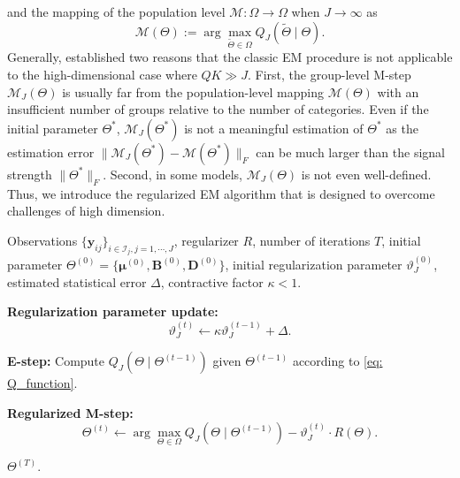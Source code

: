 \documentclass[]{report}
\theoremstyle{definition}
\begin{document}
and the mapping of the population level $\mathcal{M}:\Omega \to \Omega$ when $J\to \infty$ as
\begin{equation}
    \mathcal{M}(\Theta):=\arg\max\limits_{\tilde{\Theta} \in \Omega}Q_{J}(\tilde{\Theta}\mid \Theta).
\end{equation}
Generally, \cite{yi2015regularizedemalgorithmsunified} established two reasons that the classic EM procedure is not applicable to the high-dimensional case where $QK\gg J$. First, the group-level M-step $\mathcal{M}_{J}(\Theta)$ is usually far from the population-level mapping $\mathcal{M}(\Theta)$ with an insufficient number of groups relative to the number of categories. Even if the initial parameter $\Theta^{*}$, $\mathcal{M}_{J}(\Theta^{*})$ is not a meaningful estimation of $\Theta^{*}$ as the estimation error $\lVert \mathcal{M}_{J}(\Theta^{*})-\mathcal{M}(\Theta^{*}) \rVert_F$ can be much larger than the signal strength $\lVert \Theta^{*} \rVert_F$.  Second, in some models, $\mathcal{M}_{J}(\Theta)$ is not even well-defined.
Thus, we introduce the regularized EM algorithm that is designed to overcome challenges of high dimension.
\begin{algorithm}[H]
\caption{High Dimensional Regularized EM Algorithm \cite{yi2015regularizedemalgorithmsunified}} 
\begin{algorithmic}[1]
 
\Require Observations $\{\bm{y}_{ij}\}_{i\in \mathcal{I}_{j},j=1,\cdots,J}$, regularizer $R$, number of iterations $T$, 
initial parameter $\Theta^{(0)}=\{\bm{\mu}^{(0)},\mathbf{B}^{(0)},\mathbf{D}^{(0)}\}$, initial regularization parameter $\vartheta_{J}^{(0)}$, 
estimated statistical error $\Delta$, contractive factor $\kappa < 1$.


\State \textbf{Regularization parameter update:}
\[
\vartheta_{J}^{(t)} \leftarrow \kappa \vartheta_{J}^{(t-1)} + \Delta .
\]

\State \textbf{E-step:} Compute $Q_{J}(\Theta \mid \Theta^{(t-1)})$ given $\Theta^{(t-1)}$ according to \ref{eq: Q_function}.

\State \textbf{Regularized M-step:}
\[
\Theta^{(t)}
\leftarrow
\arg\max_{\Theta \in \Omega}
Q_{J}(\Theta \mid \Theta^{(t-1)})
-
\vartheta_{J}^{(t)} \cdot R(\Theta).
\]

\EndFor
 
\Ensure $\Theta^{(T)}$.

\end{algorithmic}
\end{algorithm}

\end{document}
